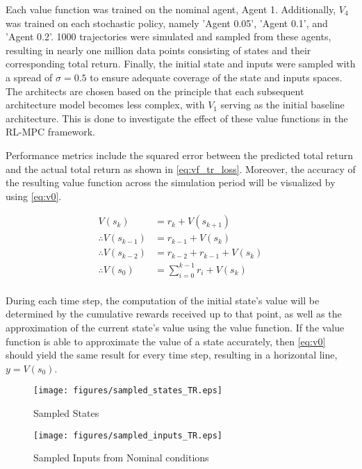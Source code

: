 Each value function was trained on the nominal agent, Agent 1. Additionally, $V_4$ was trained on each stochastic policy, namely 'Agent 0.05', 'Agent 0.1', and 'Agent 0.2'. 1000 trajectories were simulated and sampled from these agents, resulting in nearly one million data points consisting of states and their corresponding total return. Finally, the initial state and inputs were sampled with a spread of $\sigma = 0.5$ to ensure adequate coverage of the state and inputs spaces. The architects are chosen based on the principle that each subsequent architecture model becomes less complex, with $V_1$ serving as the initial baseline architecture. This is done to investigate the effect of these value functions in the RL-MPC framework.

Performance metrics include the squared error between the predicted total return and the actual total return as shown in \autoref{eq:vf_tr_loss}. Moreover, the accuracy of the resulting value function across the simulation period will be visualized by using \autoref{eq:v0}.

\begin{equation}\label{eq:v0}
\begin{aligned}
    V(s_k) &= r_k + V(s_{k+1}) \\
    \therefore V(s_{k-1}) &= r_{k-1} + V(s_{k}) \\
    \therefore V(s_{k-2}) &= r_{k-2} + r_{k-1} + V(s_{k}) \\
    \therefore V(s_{0}) &= \sum_{i=0}^{k-1} {r_{i}} + V(s_{k})   \\
\end{aligned}
\end{equation}

During each time step, the computation of the initial state's value will be determined by the cumulative rewards received up to that point, as well as the approximation of the current state's value using the value function. If the value function is able to approximate the value of a state accurately, then \autoref{eq:v0} should yield the same result for every time step, resulting in a horizontal line, $y = V(s_0)$.

\begin{figure}[H]
    \centering
    \texttt{[image: figures/sampled\_states\_TR.eps]}
    \caption{Sampled States}
    \label{fig:sampled-states-TR}
\end{figure}


\begin{figure}[H]
    \centering
    \texttt{[image: figures/sampled\_inputs\_TR.eps]}
    \caption{Sampled Inputs from Nominal conditions}
    \label{fig:sampled-inputs-TR}
\end{figure}

